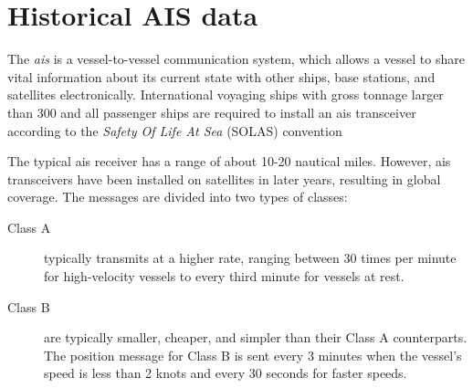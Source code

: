 \chapter{Historical AIS data}\label{chap:ais}

The \textit{\acrfull{ais}} is a vessel-to-vessel communication system, which allows a vessel to share vital information about its current state with other ships, base stations, and satellites electronically. International voyaging ships with gross tonnage larger than 300 and all passenger ships are required to install an \acrshort{ais} transceiver according to the \textit{Safety Of Life At Sea} (SOLAS) convention \cite{ais_wiki}

The typical \acrshort{ais} receiver has a range of about 10-20 nautical miles. However, \acrshort{ais} transceivers have been installed on satellites in later years, resulting in global coverage. The messages are divided into two types of classes:
\begin{description}
    \item[Class A] typically transmits at a higher rate, ranging between 30 times per minute for high-velocity vessels to every third minute for vessels at rest. 
    \item[Class B] are typically smaller, cheaper, and simpler than their Class A counterparts. The position message for Class B is sent every 3 minutes when the vessel's speed is less than 2 knots and every 30 seconds for faster speeds. 
\end{description}

